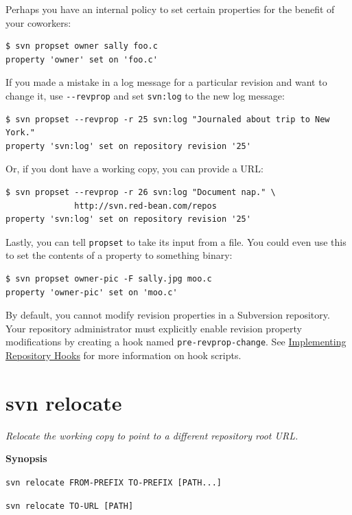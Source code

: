 Perhaps you have an internal policy to set certain properties for the
benefit of your coworkers:

\begin{verbatim}
$ svn propset owner sally foo.c
property 'owner' set on 'foo.c'
\end{verbatim}

If you made a mistake in a log message for a particular revision and
want to change it, use \texttt{-\/-revprop} and set \texttt{svn:log} to
the new log message:

\begin{verbatim}
$ svn propset --revprop -r 25 svn:log "Journaled about trip to New York."
property 'svn:log' set on repository revision '25'
\end{verbatim}

Or, if you don\textquotesingle t have a working copy, you can provide a
URL:

\begin{verbatim}
$ svn propset --revprop -r 26 svn:log "Document nap." \
              http://svn.red-bean.com/repos
property 'svn:log' set on repository revision '25'
\end{verbatim}

Lastly, you can tell \texttt{propset} to take its input from a file. You
could even use this to set the contents of a property to something
binary:

\begin{verbatim}
$ svn propset owner-pic -F sally.jpg moo.c 
property 'owner-pic' set on 'moo.c'
\end{verbatim}

By default, you cannot modify revision properties in a Subversion
repository. Your repository administrator must explicitly enable
revision property modifications by creating a hook named
\texttt{pre-revprop-change}. See
\hyperref[svn.reposadmin.hooks]{Implementing Repository Hooks} for more
information on hook scripts.

\section{svn relocate}\label{svn.ref.svn.c.relocate}

\emph{Relocate the working copy to point to a different repository root
URL.}

\textbf{Synopsis}

\texttt{svn\ relocate\ FROM-PREFIX\ TO-PREFIX\ {[}PATH...{]}}

\texttt{svn\ relocate\ TO-URL\ {[}PATH{]}}

